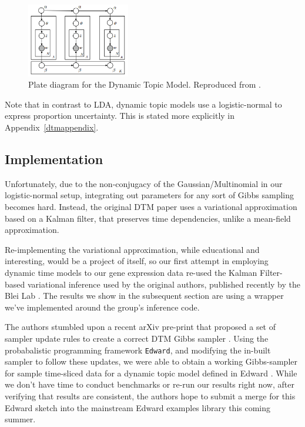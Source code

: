 \documentclass{article}
\begin{document}
\begin{figure}[h]
    \vspace{-0.1in}
    \centering
    \includegraphics[width=0.4\textwidth]{figs/dtmplate}
    \caption{Plate diagram for the Dynamic Topic Model. Reproduced from \cite{dtm}.}
    \label{fig:dtmplate}
    \vspace{-0.1in}
\end{figure}

Note that in contrast to LDA, dynamic topic models use a logistic-normal to express proportion uncertainty. This is stated more explicitly in Appendix~\ref{dtmappendix}.

\subsection{Implementation}

Unfortunately, due to the non-conjugacy of the Gaussian/Multinomial in our logistic-normal setup, integrating out parameters for any sort of Gibbs sampling becomes hard. Instead, the original DTM paper uses a variational approximation based on a Kalman filter, that preserves time dependencies, unlike a mean-field approximation.

Re-implementing the variational approximation, while educational and interesting, would be a project of itself, so our first attempt in employing dynamic time models to our gene expression data re-used the Kalman Filter-based variational inference used by the original authors, published recently by the Blei Lab \cite{dtmbleigit}. The results we show in the subsequent section are using a wrapper we've implemented around the group's inference code.

The authors stumbled upon a recent arXiv pre-print that proposed a set of sampler update rules to create a correct DTM Gibbs sampler \cite{sdtm}. Using the probabalistic programming framework \texttt{Edward}, and modifying the in-built sampler to follow these updates, we were able to obtain a working Gibbs-sampler for sample time-sliced data for a dynamic topic model defined in Edward \cite{edward}. While we don't have time to conduct benchmarks or re-run our results right now, after verifying that results are consistent, the authors hope to submit a merge for this Edward sketch into the mainstream Edward examples library this coming summer.
\end{document}
